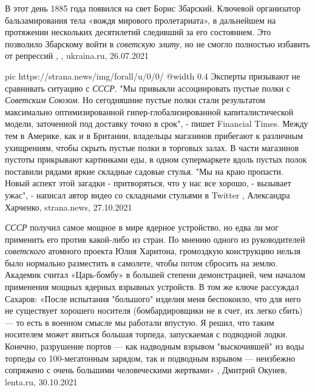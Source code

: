 В этот день 1885 года появился на свет Борис Збарский. Ключевой организатор
бальзамирования тела «вождя мирового пролетариата», в дальнейшем на протяжении
нескольких десятилетий следивший за его состоянием. Это позволило Збарскому
войти в \emph{советскую элиту}, но не смогло полностью избавить от репрессий
, 
, ukraina.ru, 26.07.2021

\ifcmt
  pic https://strana.news/img/forall/u/0/0/%
  @width 0.4
\fi
Эксперты призывают не сравнивать ситуацию с \emph{СССР}.  "Мы привыкли
ассоциировать пустые полки с \emph{Советским Союзом}. Но сегодняшние пустые
полки стали результатом максимально оптимизированной гипер-глобализированной
капиталистической модели, заточенной под доставку точно в срок", - пишет
Financial Times.  Между тем в Америке, как и в Британии, владельцы магазинов
прибегают к различным ухищрениям, чтобы скрыть пустые полки в торговых залах. В
части магазинов пустоты прикрывают картинками еды, в одном супермаркете вдоль
пустых полок поставили рядами яркие складные садовые стулья.  "Мы на краю
пропасти. Новый аспект этой загадки - притворяться, что у нас все хорошо, -
вызывает ужас", - написал автор видео со складными стульями в Twitter
, 
Александра Харченко, strana.news, 27.10.2021

\emph{СССР} получил самое мощное в мире ядерное устройство, но едва ли мог применить
его против какой-либо из стран. По мнению одного из руководителей \emph{советского}
атомного проекта Юлия Харитона, громоздкую конструкцию нельзя было нормально
разместить в самолете, чтобы потом сбросить на землю. Академик считал
«Царь-бомбу» в большей степени демонстрацией, чем началом применения мощных
ядерных взрывных устройств. В том же ключе рассуждал Сахаров: «После испытания
"большого" изделия меня беспокоило, что для него не существует хорошего
носителя (бомбардировщики не в счет, их легко сбить) — то есть в военном смысле
мы работали впустую. Я решил, что таким носителем может явиться большая
торпеда, запускаемая с подводной лодки. Конечно, разрушение портов — как
надводным взрывом "выскочившей" из воды торпеды со 100-мегатонным зарядом, так
и подводным взрывом — неизбежно сопряжено с очень большими человеческими
жертвами»
, Дмитрий Окунев, lenta.ru, 30.10.2021
